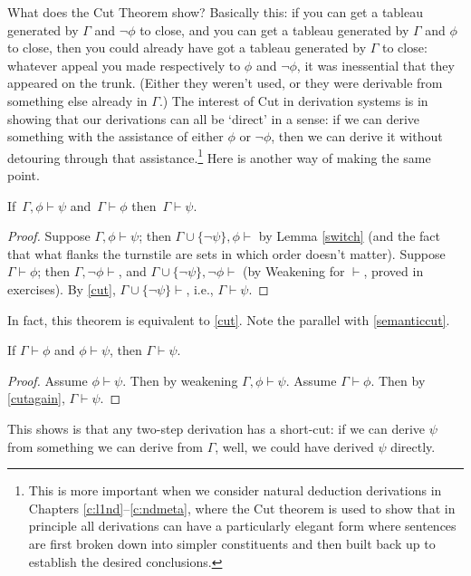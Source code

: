 What does the Cut Theorem show? Basically this: if you can get a tableau generated by $\Gamma$ and $\neg\phi$ to close, and you can get a tableau generated by $\Gamma$ and $\phi$ to close, then you could already have got a tableau generated by $\Gamma$ to close: whatever appeal you made respectively to $\phi$ and $\neg\phi$, it was inessential that they appeared on the trunk. (Either they weren't used, or they were derivable from something else already in $\Gamma$.) The interest of Cut in derivation systems is in showing that our derivations can all be `direct' in a sense: if we can derive something with the assistance of either $\phi$ or $¬\phi$, then we can derive it without detouring through that assistance.\footnote{This is more important when we consider natural deduction derivations in Chapters \ref{c:l1nd}–\ref{c:ndmeta}, where the Cut theorem is used to show that in principle all derivations can have a particularly elegant form where sentences are first broken down into simpler constituents and then built back up to establish the desired conclusions.}
Here is another way of making the same point. \begin{theorem}\label{cutagain}
	If\, $\Gamma, \phi\vdash \psi$ and\, $\Gamma\vdash \phi$ then\, $\Gamma\vdash \psi$. \begin{proof}
		Suppose $\Gamma,\phi\vdash \psi$; then $\Gamma\cup\{¬\psi\}, \phi\vdash$ by Lemma \ref{switch} (and the fact that what flanks the turnstile are sets in which order doesn't matter). Suppose $\Gamma\vdash \phi$; then $\Gamma,¬ \phi\vdash$, and $\Gamma\cup\{¬\psi\},¬ \phi\vdash$ (by Weakening for $\vdash$, proved in exercises). By \autoref{cut}, $\Gamma\cup\{¬ \psi\}\vdash$, i.e., $\Gamma\vdash \psi$.
	\end{proof}
\end{theorem} In fact, this theorem is equivalent to \autoref{cut}. Note the parallel with \autoref{semanticcut}.

\begin{theorem}
If $\Gamma \vdash \phi$ and $\phi \vdash \psi$, then $\Gamma \vdash \psi$.
\end{theorem}
\begin{proof}
Assume $\phi\vdash \psi$. Then by weakening $\Gamma,\phi \vdash \psi$. Assume $\Gamma\vdash \phi$. Then by \autoref{cutagain}, $\Gamma\vdash \psi$.
\end{proof}
This shows is that any two-step derivation has a short-cut: if we can derive $\psi$ from something we can derive from $\Gamma$, well, we could have derived $\psi$ directly.


